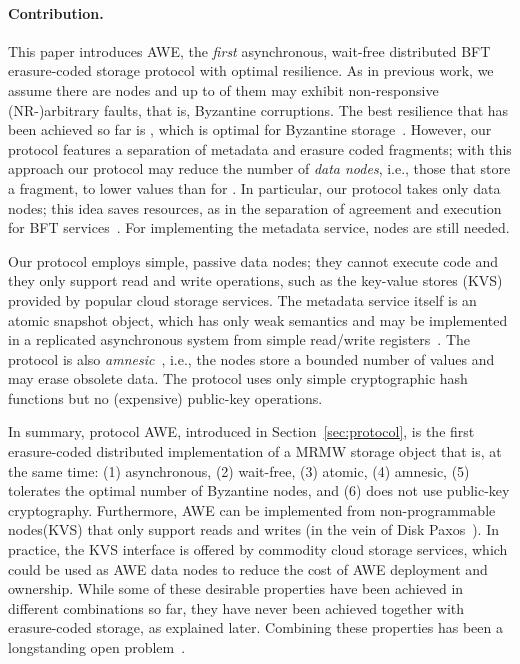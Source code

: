 \documentclass[oribibl]{llncs}
\theoremstyle{definition-boldhead}
\newcommand{\NAME}{AWE\xspace}
\newcommand{\nodes}{nodes\xspace}
\begin{document}
\paragraph{Contribution.}
This paper introduces \NAME, the \emph{first} asynchronous, wait-free
distributed BFT erasure-coded storage protocol with optimal
resilience.   As in
previous work, we assume there are  \nodes and up to  of them
may exhibit non-responsive (NR-)arbitrary faults, that is, Byzantine
corruptions.  The best resilience that has been achieved so far is , which is optimal for Byzantine storage~\cite{maalda02}.
However, our protocol features a separation of metadata and erasure coded fragments; with this approach our protocol may reduce the
number of \emph{data \nodes}, i.e., those that store a fragment, to
lower values than  for .  In particular, our protocol takes only
 data \nodes; this idea saves resources, as in the separation
of agreement and execution for BFT services~\cite{ymvad03}.  For
implementing the metadata service,  \nodes are still
needed.

Our protocol
employs simple, passive data \nodes; they cannot execute code and they
only support read and write operations, such as the key-value stores
(KVS) provided by popular cloud storage services.  The metadata
service itself is an atomic snapshot object, which has only weak
semantics and may be implemented in a replicated asynchronous system
from simple read/write registers~\cite{aadgms93}.  The protocol is
also \emph{amnesic}~\cite{chguke07}, i.e., the \nodes store a
bounded number of values and may erase obsolete data.
The protocol uses only simple cryptographic
hash functions but no (expensive) public-key operations.

In summary, protocol \NAME, introduced in Section~\ref{sec:protocol}, is the first
erasure-coded distributed implementation of a MRMW storage object that
is, at the same time: (1) asynchronous, (2) wait-free, (3) atomic, (4) amnesic, (5) tolerates the optimal number of Byzantine \nodes, and (6) does not use public-key
cryptography.  Furthermore, \NAME can be
implemented from non-programmable \nodes (KVS) that only support reads and
writes (in the vein of Disk Paxos~\cite{ackm06}). In practice, the KVS interface is offered by commodity cloud storage services, which could be used as \NAME data \nodes
to reduce the cost of \NAME deployment and ownership.
While some of these desirable properties have been achieved in different combinations so far, they have never been achieved together with erasure-coded storage, as explained later.  Combining these properties has been a longstanding open problem~\cite{gwgr04}.
\end{document}
